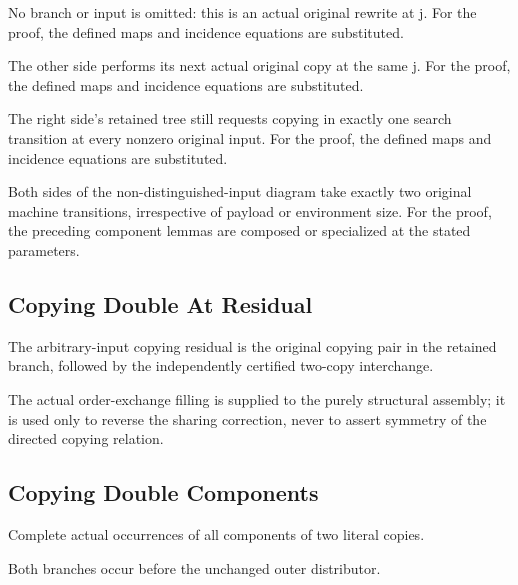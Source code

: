No branch or input is omitted: this is an actual original rewrite at j.
For the proof, the defined maps and incidence equations are substituted.
\par{}

The other side performs its next actual original copy at the same j.
For the proof, the defined maps and incidence equations are substituted.
\par{}

The right side's retained tree still requests copying in exactly one search transition at every nonzero original input.
For the proof, the defined maps and incidence equations are substituted.
\par{}

Both sides of the non-distinguished-input diagram take exactly two original machine transitions, irrespective of payload or environment size.
For the proof, the preceding component lemmas are composed or specialized at the stated parameters.
\par{}

\subsection{Copying Double At Residual}
The arbitrary-input copying residual is the original copying pair in the retained branch, followed by the independently certified two-copy interchange.

The actual order-exchange filling is supplied to the purely structural assembly; it is used only to reverse the sharing correction, never to assert symmetry of the directed copying relation.
\par{}

\subsection{Copying Double Components}
Complete actual occurrences of all components of two literal copies.

Both branches occur before the unchanged outer distributor.
\par{}


